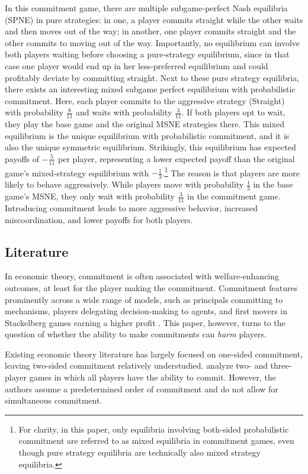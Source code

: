 \documentclass[../paper.tex]{subfiles}
\begin{document}
In this commitment game, there are multiple subgame‐perfect Nash equilibria (SPNE) in pure strategies: in one, a player commits straight while the other waits and then moves out of the way; in another, one player commits straight and the other commits to moving out of the way. Importantly, no equilibrium can involve both players waiting before choosing a pure‐strategy equilibrium, since in that case one player would end up in her less‐preferred equilibrium and could profitably deviate by committing straight. Next to these pure strategy equilibria, there exists an interesting mixed subgame perfect equilibrium with probabilistic commitment. Here, each player commits to the aggressive strategy (Straight) with probability $\frac{8}{11}$ and waits with probability $\frac{3}{11}$. If both players opt to wait, they play the base game and the original MSNE strategies there. This mixed equilibrium is the unique equilibrium with probabilistic commitment, and it is also the unique symmetric equilibrium. Strikingly, this equilibrium has expected payoffs of $-\frac{5}{11}$ per player, representing a lower expected payoff than the original game's mixed-strategy equilibrium with $-\frac{1}{3}$.\footnote{For clarity, in this paper, only equilibria involving both-sided probabilistic commitment are referred to as mixed equilibria in commitment games, even though pure strategy equilibria are technically also mixed strategy equilibria.} The reason is that players are more likely to behave aggressively. While players move with probability $\tfrac{1}{3}$ in the base game's MSNE, they only wait with probability $\tfrac{3}{11}$ in the commitment game.
Introducing commitment leads to more aggressive behavior, increased miscoordination, and lower payoffs for both players.
 
\subsection*{\centering Literature}
In economic theory, commitment is often associated with welfare-enhancing outcomes, at least for the player making the commitment. Commitment features prominently across a wide range of models, such as principals committing to mechanisms, players delegating decision-making to agents, and first movers in Stackelberg games earning a higher profit \parencite[see the discussion in][]{kalai_commitment_2010}. This paper, however, turns to the question of whether the ability to make commitments can \textit{harm} players. 
 
Existing economic theory literature has largely focused on one-sided commitment, leaving two-sided commitment relatively understudied. \textcite{harrenstein_commitment_2007} analyze two- and three-player games in which all players have the ability to commit. However, the authors assume a predetermined order of commitment and do not allow for simultaneous commitment.
 
\end{document}
